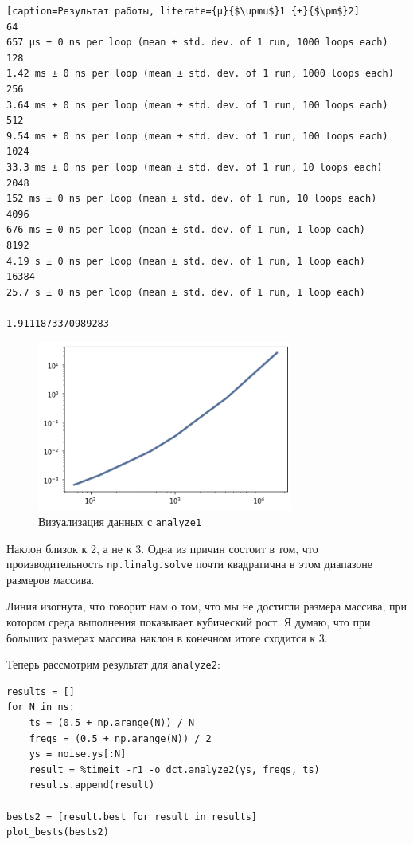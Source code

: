 \documentclass[a4paper,12pt]{report}
\begin{document}
\begin{lstlisting}[caption=Результат работы, literate={µ}{$\upmu$}1 {±}{$\pm$}2]
64
657 µs ± 0 ns per loop (mean ± std. dev. of 1 run, 1000 loops each)
128
1.42 ms ± 0 ns per loop (mean ± std. dev. of 1 run, 1000 loops each)
256
3.64 ms ± 0 ns per loop (mean ± std. dev. of 1 run, 100 loops each)
512
9.54 ms ± 0 ns per loop (mean ± std. dev. of 1 run, 100 loops each)
1024
33.3 ms ± 0 ns per loop (mean ± std. dev. of 1 run, 10 loops each)
2048
152 ms ± 0 ns per loop (mean ± std. dev. of 1 run, 10 loops each)
4096
676 ms ± 0 ns per loop (mean ± std. dev. of 1 run, 1 loop each)
8192
4.19 s ± 0 ns per loop (mean ± std. dev. of 1 run, 1 loop each)
16384
25.7 s ± 0 ns per loop (mean ± std. dev. of 1 run, 1 loop each)

1.9111873370989283
\end{lstlisting}

\begin{figure}[H]
        \centering
        \includegraphics[width=0.75\textwidth]{lab6_fig1_1.png}
        \caption{Визуализация данных с \texttt{analyze1}}
        \label{fig:lab6_fig1_1}
\end{figure}

Наклон близок к 2, а не к 3. Одна из причин состоит в том, что производительность \texttt{np.linalg.solve} почти квадратична в этом диапазоне размеров массива.

Линия изогнута, что говорит нам о том, что мы не достигли размера массива, при котором среда выполнения показывает кубический рост. Я думаю, что при больших размерах массива наклон в конечном итоге сходится к 3.

Теперь рассмотрим результат для \texttt{analyze2}:

\begin{lstlisting}[caption=Работа с \texttt{analyze2}]
results = []
for N in ns:
    ts = (0.5 + np.arange(N)) / N
    freqs = (0.5 + np.arange(N)) / 2
    ys = noise.ys[:N]
    result = %timeit -r1 -o dct.analyze2(ys, freqs, ts)
    results.append(result)

bests2 = [result.best for result in results]
plot_bests(bests2)
\end{lstlisting}
\end{document}
